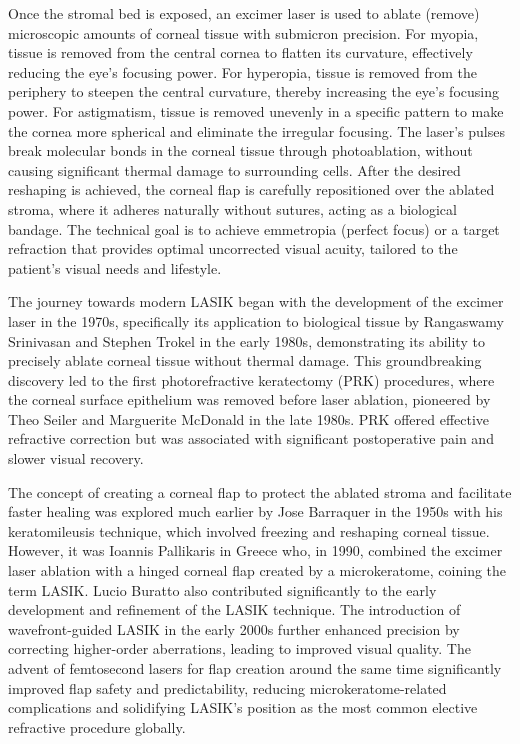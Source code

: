 Once the stromal bed is exposed, an excimer laser is used to ablate (remove) microscopic amounts of corneal tissue with submicron precision. For myopia, tissue is removed from the central cornea to flatten its curvature, effectively reducing the eye's focusing power. For hyperopia, tissue is removed from the periphery to steepen the central curvature, thereby increasing the eye's focusing power. For astigmatism, tissue is removed unevenly in a specific pattern to make the cornea more spherical and eliminate the irregular focusing. The laser's pulses break molecular bonds in the corneal tissue through photoablation, without causing significant thermal damage to surrounding cells. After the desired reshaping is achieved, the corneal flap is carefully repositioned over the ablated stroma, where it adheres naturally without sutures, acting as a biological bandage. The technical goal is to achieve emmetropia (perfect focus) or a target refraction that provides optimal uncorrected visual acuity, tailored to the patient's visual needs and lifestyle.

The journey towards modern LASIK began with the development of the excimer laser in the 1970s, specifically its application to biological tissue by Rangaswamy Srinivasan and Stephen Trokel in the early 1980s, demonstrating its ability to precisely ablate corneal tissue without thermal damage. This groundbreaking discovery led to the first photorefractive keratectomy (PRK) procedures, where the corneal surface epithelium was removed before laser ablation, pioneered by Theo Seiler and Marguerite McDonald in the late 1980s. PRK offered effective refractive correction but was associated with significant postoperative pain and slower visual recovery.

The concept of creating a corneal flap to protect the ablated stroma and facilitate faster healing was explored much earlier by Jose Barraquer in the 1950s with his keratomileusis technique, which involved freezing and reshaping corneal tissue. However, it was Ioannis Pallikaris in Greece who, in 1990, combined the excimer laser ablation with a hinged corneal flap created by a microkeratome, coining the term LASIK. Lucio Buratto also contributed significantly to the early development and refinement of the LASIK technique. The introduction of wavefront-guided LASIK in the early 2000s further enhanced precision by correcting higher-order aberrations, leading to improved visual quality. The advent of femtosecond lasers for flap creation around the same time significantly improved flap safety and predictability, reducing microkeratome-related complications and solidifying LASIK's position as the most common elective refractive procedure globally.

